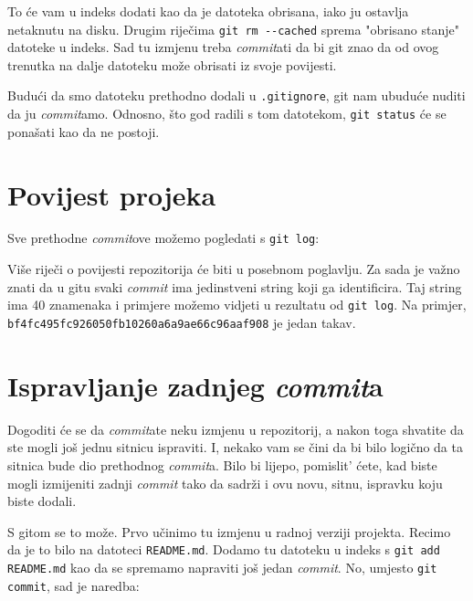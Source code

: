 
To će vam u indeks dodati kao da je datoteka obrisana, iako ju ostavlja netaknutu na disku.
Drugim riječima \verb+git rm --cached+ sprema "obrisano stanje" datoteke u indeks.
Sad tu izmjenu treba \emph{commit}ati da bi git znao da od ovog trenutka na dalje datoteku može obrisati iz svoje povijesti.

Budući da smo datoteku prethodno dodali u \verb+.gitignore+, git nam ubuduće nuditi da ju \emph{commit}amo.
Odnosno, što god radili s tom datotekom, \verb+git status+ će se ponašati kao da ne postoji.

\section*{Povijest projeka}

Sve prethodne \emph{commit}ove možemo pogledati s \verb+git log+:



Više riječi o povijesti repozitorija će biti u posebnom poglavlju. 
Za sada je važno znati da u gitu svaki \emph{commit} ima jedinstveni string koji ga identificira.
Taj string ima 40 znamenaka i primjere možemo vidjeti u rezultatu od \verb+git log+.
Na primjer, \\\verb+bf4fc495fc926050fb10260a6a9ae66c96aaf908+ je jedan takav.

\section*{Ispravljanje zadnjeg \emph{commit}a}

Dogoditi će se da \emph{commit}ate neku izmjenu u repozitorij, a nakon toga shvatite da ste mogli još jednu sitnicu ispraviti.
I, nekako vam se čini da bi bilo logično da ta sitnica bude dio prethodnog \emph{commit}a.
Bilo bi lijepo, pomislit' ćete, kad biste mogli izmijeniti zadnji \emph{commit} tako da sadrži i ovu novu, sitnu, ispravku koju biste dodali.

S gitom se to može.
Prvo učinimo tu izmjenu u radnoj verziji projekta. 
Recimo da je to bilo na datoteci \verb+README.md+.
Dodamo tu datoteku u indeks s \verb+git add README.md+ kao da se spremamo napraviti još jedan \emph{commit}.
No, umjesto \verb+git commit+, sad je naredba:


